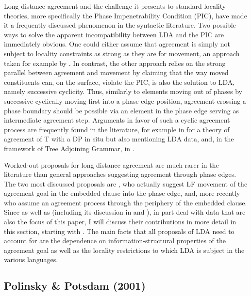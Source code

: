 \documentclass[output=paper
,modfonts
,nonflat]{langsci/langscibook}
\begin{document}
Long distance agreement and the challenge it presents to standard locality theories, more specifically the Phase Impenetrability Condition (PIC), have made it a frequently discussed phenomenon in the syntactic literature. Two possible ways to solve the apparent incompatibility between LDA and the PIC are immediately obvious. One could either assume that agreement is simply not subject to locality constraints as strong as they are for movement, an approach taken for example by \citet{Boskovic2007}. In contrast, the other approach relies on the strong parallel between agreement and movement by claiming that the way moved constituents can, on the surface, violate the PIC, is also the solution to LDA, namely successive cyclicity. Thus, similarly to elements moving out of phases by successive cyclically moving first into a phase edge position, agreement crossing a phase boundary should be possible via an element in the phase edge serving as intermediate agreement step. Arguments in favor of such a cyclic agreement process are frequently found in the literature, for example in \citet{Legate2005} for a theory of agreement of T with a DP in situ but also mentioning LDA data, and, in the framework of Tree Adjoining Grammar, in \citet{Frank2006}. 

Worked-out proposals for long distance agreement are much rarer in the literature than general approaches suggesting agreement through phase edges. The two most discussed proposals are \citet{Polinsky_Potsdam2001}, who actually suggest LF movement of the agreement goal in the embedded clause into the phase edge, and, more recently \citet{Bjorkman_Zeijlstra2014} who assume an agreement process through the periphery of the embedded clause. Since \citet{Polinsky_Potsdam2001} as well as \citet{Bjorkman_Zeijlstra2014} (including its discussion in \citealt{Preminger2013} and \citealt{Preminger_Polinsky2015}), in part deal with data that are also the focus of this paper, I will discuss their contributions in more detail in this section, starting with \citet{Polinsky_Potsdam2001}. The main facts that all proposals of LDA need to account for are the dependence on information-structural properties of the agreement goal as well as the locality restrictions to which LDA is subject in the various languages.

\subsection{Polinsky \& Potsdam (2001)}\largerpage
\end{document}
